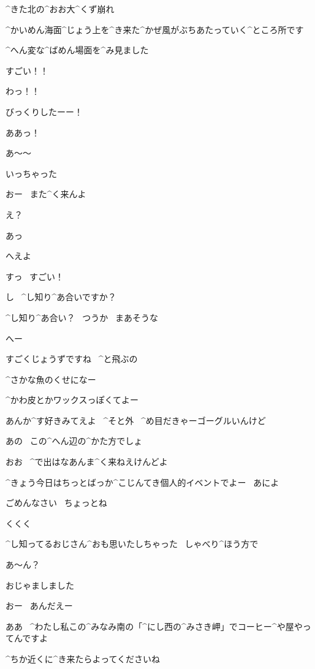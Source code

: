 \page[52]
\Alpha ^{きた}{北}の^{おお}{大}^{くず}{崩}れ

\Alpha ^{かいめん}{海面}^{じょう}{上}を^{き}{来}た^{かぜ}{風}がぶちあたっていく^{ところ}{所}です

\page
\Alpha ^{へん}{変}な^{ばめん}{場面}を^{み}{見}ました

\page[55]
\Alpha すごい！！

\Ayase わっ！！

\Ayase びっくりしたーー！

\Alpha ああっ！

\page[57]
\Alpha あ〜〜

\Alpha いっちゃった

\Ayase おー
\ また^{く}{来}んよ

\Alpha え？

\Alpha あっ

\page
\Ayase へえよ

\Alpha すっ
\ すごい！

\Alpha し
\ ^{し}{知}り^{あ}{合}いですか？

\Ayase ^{し}{知}り^{あ}{合}い？
\ つうか
\ まあそうな

\page
\Alpha へー

\page
\Alpha すごくじょうずですね
\ ^{と}{飛}ぶの

\Ayase ^{さかな}{魚}のくせになー

\Ayase ^{かわ}{皮}とかワックスっぽくてよー

\Ayase あんか^{す}{好}きみてえよ
\ ^{そと}{外}
\ ^{め}{目}だきゃーゴーグルいんけど

\page
\Alpha あの
\ この^{へん}{辺}の^{かた}{方}でしょ

\Ayase おお
\ ^{で}{出}はなあんま^{く}{来}ねえけんどよ

\Ayase ^{きょう}{今日}はちっとばっか^{こじんてき}{個人的}イベントでよー
\ あによ

\Alpha ごめんなさい
\ ちょっとね

\Alpha くくく

\Alpha ^{し}{知}ってるおじさん^{おも}{思}いたしちゃった
\ しゃべり^{ほう}{方}で

\Ayase あ〜ん？

\page
\Alpha おじゃましました

\Ayase おー
\ あんだえー

\Alpha ああ
\ ^{わたし}{私}この^{みなみ}{南}の「^{にし}{西}の^{みさき}{岬}」でコーヒー^{や}{屋}やってんですよ

\Alpha ^{ちか}{近}くに^{き}{来}たらよってくださいね

